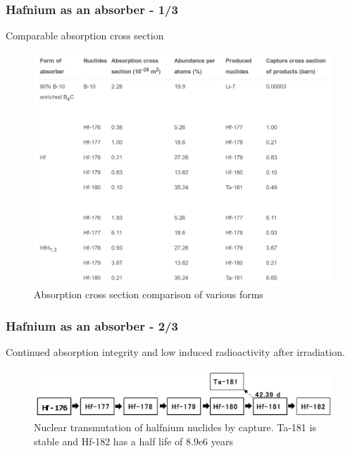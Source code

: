 \documentclass[9pt]{beamer}
\begin{document}
\begin{frame}
\frametitle{Hafnium as an absorber - 1/3}
Comparable absorption cross section
\begin{figure}[htbp!]
  \begin{center}
      \includegraphics[scale=0.25]{./images/axs.png}
  \end{center}
  \caption{Absorption cross section comparison of various forms}
  \label{fig:axs}
\end{figure}

\end{frame}

\begin{frame}
\frametitle{Hafnium as an absorber - 2/3}
Continued absorption integrity and low induced radioactivity after irradiation.

\begin{figure}[htbp!]
  \begin{center}
      \includegraphics[scale=0.2]{./images/decay_chain.png}
  \end{center}
  \caption{Nuclear transmutation of halfnium nuclides by capture. Ta-181 is stable and Hf-182
            has a half life of 8.9e6 years}
  \label{fig:dec}
\end{figure}
\end{frame}
\end{document}
